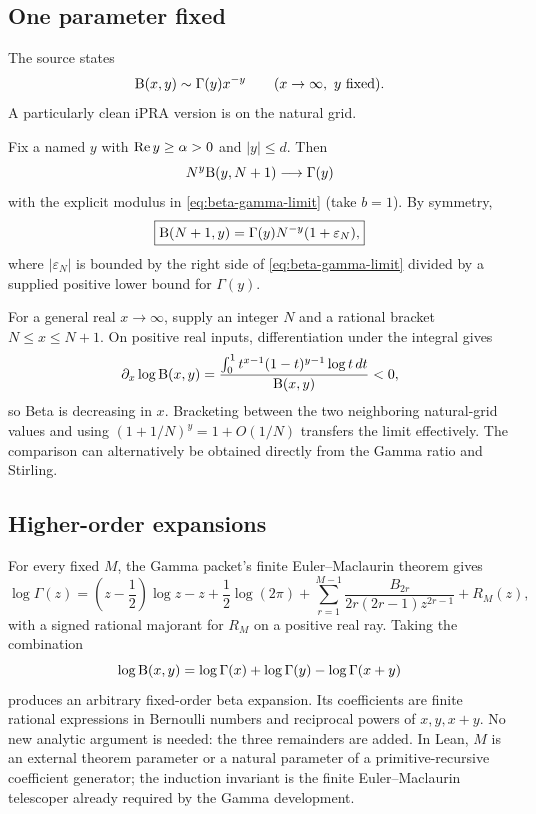\subsection{One parameter fixed}

The source states
\[
 \mathrm B(x,y)\sim\Gamma(y)x^{-y}
 \qquad(x\to\infty,\ y\text{ fixed}).
\]
A particularly clean iPRA version is on the natural grid.

\begin{theorem}\label{thm:fixed-y-asymp}
Fix a named $y$ with $\operatorname{Re} y\ge\alpha>0$ and $|y|\le d$.  Then
\[
 N^y\mathrm B(y,N+1)\longrightarrow\Gamma(y)
\]
with the explicit modulus in \eqref{eq:beta-gamma-limit} (take $b=1$).  By symmetry,
\[
 \boxed{\mathrm B(N+1,y)=\Gamma(y)N^{-y}(1+\varepsilon_N),}
\]
where $|\varepsilon_N|$ is bounded by the right side of
\eqref{eq:beta-gamma-limit} divided by a supplied positive lower bound for $\Gamma(y)$.
\end{theorem}

For a general real $x\to\infty$, supply an integer $N$ and a rational bracket
$N\le x\le N+1$.  On positive real inputs, differentiation under the integral gives
\[
 \partial_x\log\mathrm B(x,y)
 =\frac{\int_0^1 t^{x-1}(1-t)^{y-1}\log t\,dt}
        {\mathrm B(x,y)}<0,
\]
so Beta is decreasing in $x$.  Bracketing between the two neighboring natural-grid values and using
$(1+1/N)^y=1+O(1/N)$ transfers the limit effectively.  The comparison can alternatively be obtained directly from the Gamma ratio and Stirling.

\subsection{Higher-order expansions}

For every fixed $M$, the Gamma packet's finite Euler--Maclaurin theorem gives
\[
 \log\Gamma(z)
 =
 \left(z-\frac12\right)\log z-z+\frac12\log(2\pi)
 +\sum_{r=1}^{M-1}
   \frac{B_{2r}}{2r(2r-1)z^{2r-1}}
 +R_M(z),
\]
with a signed rational majorant for $R_M$ on a positive real ray.  Taking the combination
\[
 \log\mathrm B(x,y)=\log\Gamma(x)+\log\Gamma(y)-\log\Gamma(x+y)
\]
produces an arbitrary fixed-order beta expansion.  Its coefficients are finite rational expressions in Bernoulli numbers and reciprocal powers of $x,y,x+y$.  No new analytic argument is needed: the three remainders are added.  In Lean, $M$ is an external theorem parameter or a natural parameter of a primitive-recursive coefficient generator; the induction invariant is the finite Euler--Maclaurin telescoper already required by the Gamma development.

